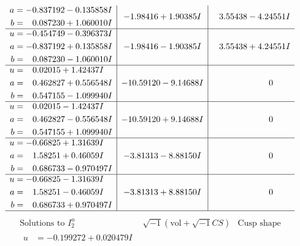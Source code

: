 \documentclass[1p]{elsarticle_modified}
\theoremstyle{definition}
\newcommand{\I}{\sqrt{-1}}
\begin{document}
$$\begin{array}{c|c|c}
\begin{aligned}
a &= -0.837192 - 0.135858 I \\
b &= \phantom{-}0.087230 + 1.060010 I\end{aligned}
 & -1.98416 + 1.90385 I & \phantom{-}3.55438 - 4.24551 I \\ \hline\begin{aligned}
u &= -0.454749 - 0.396373 I \\
a &= -0.837192 + 0.135858 I \\
b &= \phantom{-}0.087230 - 1.060010 I\end{aligned}
 & -1.98416 - 1.90385 I & \phantom{-}3.55438 + 4.24551 I \\ \hline\begin{aligned}
u &= \phantom{-}0.02015 + 1.42437 I \\
a &= \phantom{-}0.462827 + 0.556548 I \\
b &= \phantom{-}0.547155 - 1.099940 I\end{aligned}
 & -10.59120 - 9.14688 I & \phantom{-0.000000 } 0 \\ \hline\begin{aligned}
u &= \phantom{-}0.02015 - 1.42437 I \\
a &= \phantom{-}0.462827 - 0.556548 I \\
b &= \phantom{-}0.547155 + 1.099940 I\end{aligned}
 & -10.59120 + 9.14688 I & \phantom{-0.000000 } 0 \\ \hline\begin{aligned}
u &= -0.66825 + 1.31639 I \\
a &= \phantom{-}1.58251 + 0.46059 I \\
b &= \phantom{-}0.686733 - 0.970497 I\end{aligned}
 & -3.81313 - 8.88150 I & \phantom{-0.000000 } 0 \\ \hline\begin{aligned}
u &= -0.66825 - 1.31639 I \\
a &= \phantom{-}1.58251 - 0.46059 I \\
b &= \phantom{-}0.686733 + 0.970497 I\end{aligned}
 & -3.81313 + 8.88150 I & \phantom{-0.000000 } 0\\
 \hline 
 \end{array}$$\newpage$$\begin{array}{c|c|c}  
\text{Solutions to }I^u_{2}& \I (\text{vol} + \sqrt{-1}CS) & \text{Cusp shape}\\
 \hline 
\begin{aligned}
u &= -0.199272 + 0.020479 I \\

\end{aligned}
\end{array}$$
\end{document}
